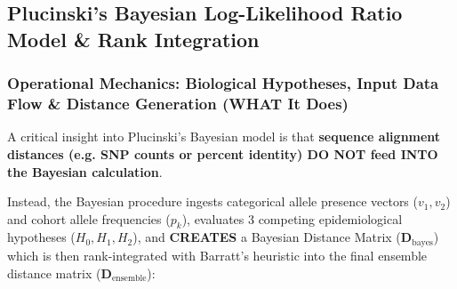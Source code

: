 \documentclass[11pt,a4paper]{article}
\begin{document}
\subsection{Plucinski's Bayesian Log-Likelihood Ratio Model \& Rank Integration}

\subsubsection{Operational Mechanics: Biological Hypotheses, Input Data Flow \& Distance Generation (WHAT It Does)}

A critical insight into Plucinski's Bayesian model is that \textbf{sequence alignment distances (e.g. SNP counts or percent identity) DO NOT feed INTO the Bayesian calculation}. 

Instead, the Bayesian procedure ingests categorical allele presence vectors ($v_1, v_2$) and cohort allele frequencies ($p_k$), evaluates 3 competing epidemiological hypotheses ($H_0, H_1, H_2$), and \textbf{CREATES} a Bayesian Distance Matrix ($\mathbf{D}_{\text{bayes}}$) which is then rank-integrated with Barratt's heuristic into the final ensemble distance matrix ($\mathbf{D}_{\text{ensemble}}$):
\end{document}
